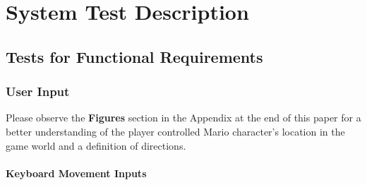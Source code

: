 \documentclass[12pt, titlepage]{article}
\begin{document}
\section{System Test Description}

\subsection{Tests for Functional Requirements}

\subsubsection{User Input}

Please observe the \textbf{Figures} section in the Appendix at the end of this paper for a better understanding of the player controlled Mario character's location in the game world and a definition of directions.

\paragraph{Keyboard Movement Inputs}
\end{document}

